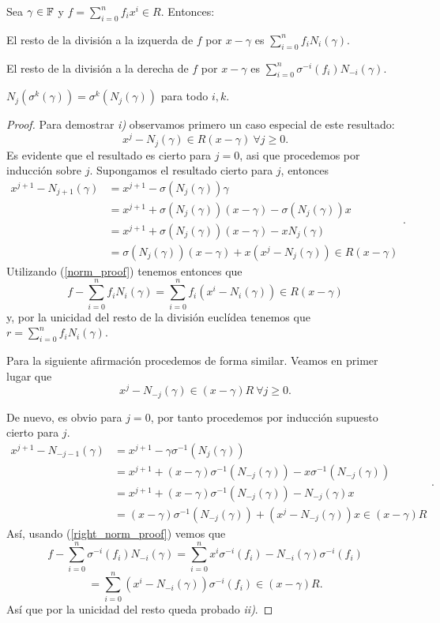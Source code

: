\begin{lemma}
\label{lem:eval}
    Sea \(\gamma \in \mathbb{F}\) y  \(f = \sum_{i=0}^n f_ix^i \in R\). Entonces:
    \begin{nlist}
    \item El resto de la división a la izquerda de \(f\) por  \(x - \gamma\) es  \(\sum_{i=0}^{n} f_i N_i(\gamma)\).
    \item El resto de la división a la derecha de \(f\) por  \(x - \gamma\) es  \(\sum_{i=0}^{n}\sigma^{-i}(f_i)N_{-i}(\gamma)\).
    \item \(N_j(\sigma^k(\gamma)) = \sigma^k(N_j(\gamma))\) para todo \(i,k\).
    \end{nlist}
\end{lemma}
\begin{proof}
    Para demostrar \textit{i)} observamos primero un caso especial de este resultado:
\begin{equation}
\label{norm_proof}
    x^j - N_j(\gamma) \in R(x-\gamma)\ \forall j \geq 0.
\end{equation}
    Es evidente que el resultado es cierto para \(j = 0\), asi que procedemos por inducción sobre \(j\). Supongamos el resultado cierto para \(j\), entonces
\[
\begin{aligned}
x^{j+1} - N_{j+1}(\gamma) &= x^{j+1} - \sigma(N_j(\gamma))\gamma \\
&= x^{j+1} +  \sigma(N_j(\gamma))(x-\gamma) - \sigma(N_j(\gamma))x \\
&= x^{j+1} +  \sigma(N_j(\gamma))(x-\gamma) - xN_j(\gamma) \\
&= \sigma(N_j(\gamma))(x-\gamma) + x(x^{j} - N_j(\gamma)) \in R(x-\gamma)
\end{aligned}
.\]
Utilizando (\ref{norm_proof}) tenemos entonces que
\[
f - \sum_{i=0}^n f_i N_i(\gamma) = \sum_{i=0}^n f_i(x^i - N_i(\gamma)) \in R(x - \gamma)
\]
y, por la unicidad del resto de la división euclídea tenemos que \(r = \sum_{i=0}^n f_i N_i(\gamma)\).

Para la siguiente afirmación procedemos de forma similar. Veamos en primer lugar que
\begin{equation}
\label{right_norm_proof}
    x^j - N_{-j}(\gamma) \in (x-\gamma)R\ \forall j \geq 0.
\end{equation}

De nuevo, es obvio para \(j = 0\), por tanto procedemos por inducción supuesto cierto para \(j\).
\[
\begin{aligned}
x^{j+1} - N_{-j-1}(\gamma) &= x^{j+1} - \gamma\sigma^{-1}(N_j(\gamma))  \\
&= x^{j+1} +  (x-\gamma)\sigma^{-1}(N_{-j}(\gamma)) - x\sigma^{-1}(N_{-j}(\gamma)) \\
&= x^{j+1} + (x-\gamma)\sigma^{-1}(N_{-j}(\gamma)) - N_{-j}(\gamma)x \\
&= (x-\gamma)\sigma^{-1}(N_{-j}(\gamma)) + (x^{j} - N_{-j}(\gamma))x \in (x-\gamma)R
\end{aligned}
.\]
Así, usando (\ref{right_norm_proof}) vemos que
\[
f - \sum_{i=0}^n \sigma^{-i}(f_i) N_{-i}(\gamma) = \sum_{i=0}^n x^i\sigma^{-i}(f_i) - N_{-i}(\gamma)\sigma^{-i}(f_i)
\]
\[
= \sum_{i=0}^n (x^i - N_{-i}(\gamma))\sigma^{-i}(f_i) \in (x - \gamma)R
.\]
Así que por la unicidad del resto queda probado \textit{ii)}.


\end{proof}
